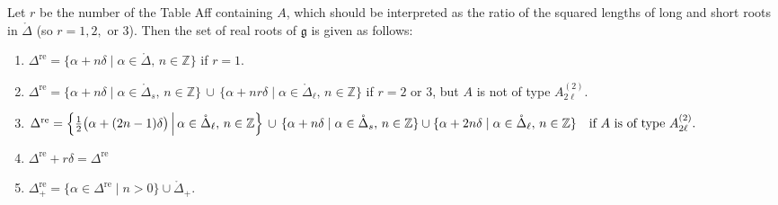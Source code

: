 \documentclass[12pt]{article}
\begin{document}
\begin{proposition}
    \label{prop:real-roots-affine}
    Let $r$ be the number of the Table Aff containing $A$, which should be interpreted as the ratio of the squared lengths of long and short roots in $\mathring{\Delta}$ (so $r=1,2,$ or $3$). Then the set of real roots of $\mathfrak{g}$ is given as follows:
    \begin{enumerate}[label=\alph*)]
        \item $\Delta^{\mathrm{re}} = \{\alpha+n\delta \mid \alpha\in \mathring{\Delta},\, n\in \mathbb{Z}\}$ \quad if $r=1$.
        \item $\Delta^{\mathrm{re}} = \{\alpha+n\delta \mid \alpha\in \mathring{\Delta}_s,\, n\in \mathbb{Z}\} \,\cup\, \{\alpha+nr\delta \mid \alpha\in \mathring{\Delta}_\ell,\, n\in \mathbb{Z}\}$
              if $r=2$ or $3$, but $A$ is not of type $A_{2\ell}^{(2)}$.
        \item $\Delta^{\mathrm{re}} = \left\{ \tfrac{1}{2}\big(\alpha+(2n-1)\delta\big) \,\middle|\, \alpha\in \mathring{\Delta}_\ell,\, n\in \mathbb{Z} \right\}
                  \,\cup\, \{\alpha+n\delta \mid \alpha\in \mathring{\Delta}_s,\, n\in \mathbb{Z}\} \\
                  \cup \{\alpha+2n\delta \mid \alpha\in \mathring{\Delta}_\ell,\, n\in \mathbb{Z}\}
                  \quad \text{if $A$ is of type $A_{2\ell}^{(2)}$.}$
        \item $\Delta^{\mathrm{re}}+r\delta=\Delta^{\mathrm{re}}$
        \item $\Delta^{\mathrm{re}}_+ = \{\alpha \in \Delta^{\mathrm{re}} \mid n>0\}\cup \mathring{\Delta}_+.$
    \end{enumerate}
\end{proposition}
\end{document}
